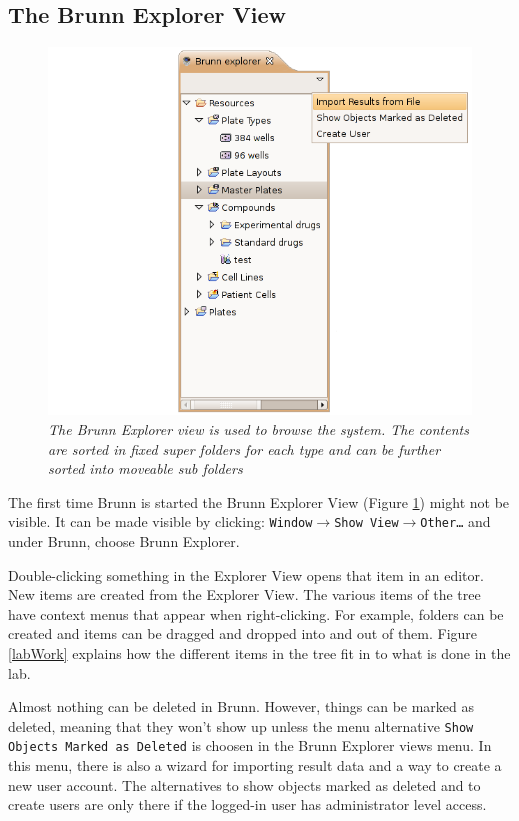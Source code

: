 \documentclass[a4paper,10pt]{article}
\begin{document}
         \subsection{The Brunn Explorer View} 
            \begin{figure}
                \begin{center}
                    \includegraphics[width=.5\textwidth]
                                    {images/explorerView.png}
                \end{center}
                \caption{\textit{The Brunn Explorer view is used to browse the
                    system. The contents are sorted in fixed super folders for
                    each type and can be further sorted into moveable sub
                    folders}}
                \label{explorerView}
            \end{figure}

            \noindent
            The first time Brunn is started the Brunn Explorer View (Figure
            \ref{explorerView}) might not be visible. It can be made visible by
            clicking: \texttt{Window$\rightarrow$Show
            View$\rightarrow$Other\ldots} and under Brunn, choose Brunn
            Explorer. 

            Double-clicking something in the Explorer View opens that item in
            an editor. New items are created from the Explorer View. The
            various items of the tree have context menus that appear when
            right-clicking. For example, folders can be created and items can be
            dragged and dropped into and out of them. Figure \ref{labWork}
            explains how the different items in the tree fit in to what is done
            in the lab.  

            Almost nothing can be deleted in Brunn. However, things can be
            marked as deleted, meaning that they won't show up unless the menu
            alternative \texttt{Show Objects Marked as Deleted} is choosen in
            the Brunn Explorer views menu. In this menu, there is also a wizard
            for importing result data and a way to create a new user account.
            The alternatives to show objects marked as deleted and to create
            users are only there if the logged-in user has administrator
            level access.
        
\end{document}
